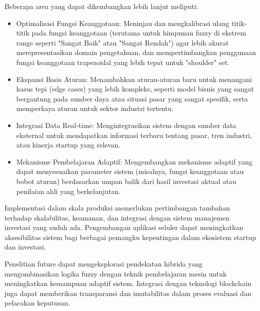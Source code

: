 \documentclass[12pt,a4paper]{article}
\begin{document}
Beberapa area yang dapat dikembangkan lebih lanjut meliputi:
\begin{itemize}
    \item Optimalisasi Fungsi Keanggotaan: Meninjau dan mengkalibrasi ulang titik-titik pada fungsi keanggotaan (terutama untuk himpunan fuzzy di ekstrem range seperti "Sangat Baik" atau "Sangat Rendah") agar lebih akurat merepresentasikan domain pengetahuan, dan mempertimbangkan penggunaan fungsi keanggotaan trapezoidal yang lebih tepat untuk "shoulder" set.
    \item Ekspansi Basis Aturan: Menambahkan aturan-aturan baru untuk menangani kasus tepi (edge cases) yang lebih kompleks, seperti model bisnis yang sangat bergantung pada sumber daya atau situasi pasar yang sangat spesifik, serta memperkaya aturan untuk sektor industri tertentu.
    \item Integrasi Data Real-time: Mengintegrasikan sistem dengan sumber data eksternal untuk mendapatkan informasi terbaru tentang pasar, tren industri, atau kinerja startup yang relevan.
    \item Mekanisme Pembelajaran Adaptif: Mengembangkan mekanisme adaptif yang dapat menyesuaikan parameter sistem (misalnya, fungsi keanggotaan atau bobot aturan) berdasarkan umpan balik dari hasil investasi aktual atau penilaian ahli yang berkelanjutan.
\end{itemize}
Implementasi dalam skala produksi memerlukan pertimbangan tambahan terhadap skalabilitas, keamanan, dan integrasi dengan sistem manajemen investasi yang sudah ada. Pengembangan aplikasi seluler dapat meningkatkan aksesibilitas sistem bagi berbagai pemangku kepentingan dalam ekosistem startup dan investasi.

Penelitian future dapat mengeksplorasi pendekatan hibrida yang mengombinasikan logika fuzzy dengan teknik pembelajaran mesin untuk meningkatkan kemampuan adaptif sistem. Integrasi dengan teknologi blockchain juga dapat memberikan transparansi dan imutabilitas dalam proses evaluasi dan pelacakan keputusan.
\end{document}
